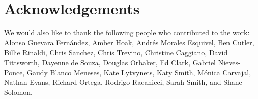 \section*{Acknowledgements}
We would also like to thank the following people who contributed to the work: Alonso Guevara Fernández, Amber Hoak, Andrés Morales Esquivel, Ben Cutler, Billie Rinaldi, Chris Sanchez, Chris Trevino, Christine Caggiano, David Tittsworth, Dayenne de Souza, Douglas Orbaker, Ed Clark, Gabriel Nieves-Ponce, Gaudy Blanco Meneses, Kate Lytvynets, Katy Smith, Mónica Carvajal, Nathan Evans, Richard Ortega, Rodrigo Racanicci, Sarah Smith, and Shane Solomon. 